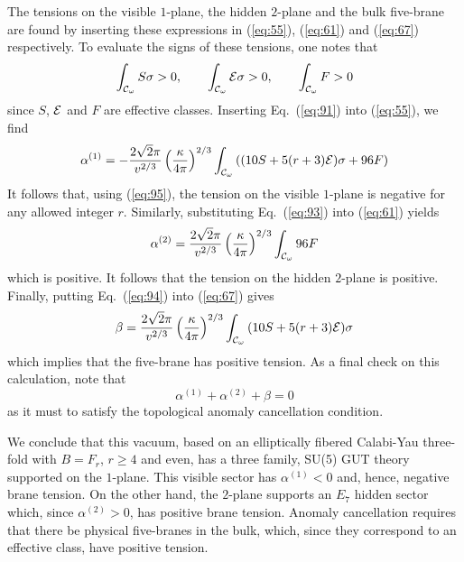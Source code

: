 \documentclass[a4paper,12pt]{article}
\numberwithin{equation}{section}
\theoremstyle{plain}
\begin{document}
The tensions on the visible $1$-plane, the hidden
$2$-plane and the bulk five-brane are found by inserting these expressions in 
(\ref{eq:55}), (\ref{eq:61}) and (\ref{eq:67}) respectively. To evaluate the
signs of these tensions, one notes that
%
\begin{equation}
\int_{{\cal{C}}_{\omega}}{S\sigma}>0, \qquad \int_{{\cal{C}}_{\omega}}
{{\cal{E}}\sigma}>0, \qquad \int_{{\cal{C}}_{\omega}}{F}>0
\label{eq:95}
\end{equation}
%
since $S$, ${\cal{E}}$ and $F$ are effective classes. Inserting
Eq.~(\ref{eq:91}) into (\ref{eq:55}),  we find 
%
\begin{equation}
\alpha^{(1)}=-\frac{2\sqrt{2}\pi}{v^{2/3}}\left(\frac{\kappa}{4\pi}\right)^{2/3}
\int_{{\cal{C}}_{\omega}}{((10S+5(r+3){\cal{E}})\sigma+96F)}
\label{eq:96}
\end{equation}
%
It follows that, using (\ref{eq:95}), the tension on the visible 
$1$-plane is negative for any allowed integer $r$. Similarly, 
substituting Eq.~(\ref{eq:93}) into (\ref{eq:61}) yields
%
\begin{equation}
\alpha^{(2)}=\frac{2\sqrt{2}\pi}{v^{2/3}}\left(\frac{\kappa}{4\pi}\right)^{2/3}
\int_{{\cal{C}}_{\omega}}{96F}
\label{eq:97}
\end{equation}
%
which is positive. It follows that 
the tension on the hidden $2$-plane is positive. Finally,
putting Eq.~(\ref{eq:94}) into (\ref{eq:67}) gives
%
\begin{equation}
\beta=\frac{2\sqrt{2}\pi}{v^{2/3}}\left(\frac{\kappa}{4\pi}\right)^{2/3}
\int_{{\cal{C}}_{\omega}}{(10S+5(r+3){\cal{E}})\sigma}
\label{eq:98}
\end{equation}
%
which implies that the five-brane has positive tension. As a final check on 
this calculation, note that 
%
\begin{equation}
\alpha^{(1)}+\alpha^{(2)}+ \beta=0
\label{eq:99}
\end{equation}
%
as it must to satisfy the topological anomaly cancellation condition.

We conclude that this vacuum, based on an elliptically fibered Calabi-Yau
three-fold with $B=F_{r}$, $r\geq 4$ and even, 
has a three family, SU(5) GUT theory supported on
the $1$-plane. This visible sector has $\alpha^{(1)}<0$ and, hence, negative
brane tension. On the other hand, the $2$-plane supports an $E_{7}$ hidden sector
which, since $\alpha^{(2)}>0$, has positive brane tension. Anomaly
cancellation requires that there be physical five-branes in the bulk, which,
since they correspond to an effective class, have positive tension.
\end{document}
